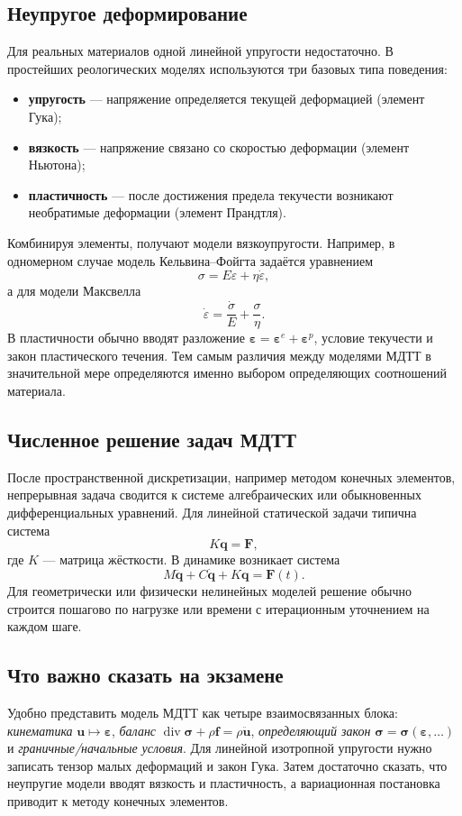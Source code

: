 \subsection{Неупругое деформирование}

Для реальных материалов одной линейной упругости недостаточно. В простейших
реологических моделях используются три базовых типа поведения:
\begin{itemize}
    \item \textbf{упругость} --- напряжение определяется текущей деформацией
    (элемент Гука);
    \item \textbf{вязкость} --- напряжение связано со скоростью деформации
    (элемент Ньютона);
    \item \textbf{пластичность} --- после достижения предела текучести возникают
    необратимые деформации (элемент Прандтля).
\end{itemize}
Комбинируя элементы, получают модели вязкоупругости. Например, в одномерном
случае модель Кельвина--Фойгта задаётся уравнением
\[
    \sigma=E\varepsilon+\eta\dot\varepsilon,
\]
а для модели Максвелла
\[
    \dot\varepsilon=\frac{\dot\sigma}{E}+\frac{\sigma}{\eta}.
\]
В пластичности обычно вводят разложение
$\boldsymbol\varepsilon=\boldsymbol\varepsilon^e+
\boldsymbol\varepsilon^p$, условие текучести и закон пластического течения.
Тем самым различия между моделями МДТТ в значительной мере определяются именно
выбором определяющих соотношений материала.

\subsection{Численное решение задач МДТТ}

После пространственной дискретизации, например методом конечных элементов,
непрерывная задача сводится к системе алгебраических или обыкновенных
дифференциальных уравнений. Для линейной статической задачи типична система
\[
    K\mathbf q=\mathbf F,
\]
где $K$ --- матрица жёсткости. В динамике возникает система
\[
    M\ddot{\mathbf q}+C\dot{\mathbf q}+K\mathbf q=\mathbf F(t).
\]
Для геометрически или физически нелинейных моделей решение обычно строится
пошагово по нагрузке или времени с итерационным уточнением на каждом шаге.

\subsection{Что важно сказать на экзамене}

Удобно представить модель МДТТ как четыре взаимосвязанных блока:
\emph{кинематика} $\mathbf u\mapsto\boldsymbol\varepsilon$,
\emph{баланс} $\operatorname{div}\boldsymbol\sigma+\rho\mathbf f
=\rho\ddot{\mathbf u}$, \emph{определяющий закон}
$\boldsymbol\sigma=\boldsymbol\sigma(\boldsymbol\varepsilon,\ldots)$ и
\emph{граничные/начальные условия}. Для линейной изотропной упругости нужно
записать тензор малых деформаций и закон Гука. Затем достаточно сказать, что
неупругие модели вводят вязкость и пластичность, а вариационная постановка
приводит к методу конечных элементов.

\newpage

